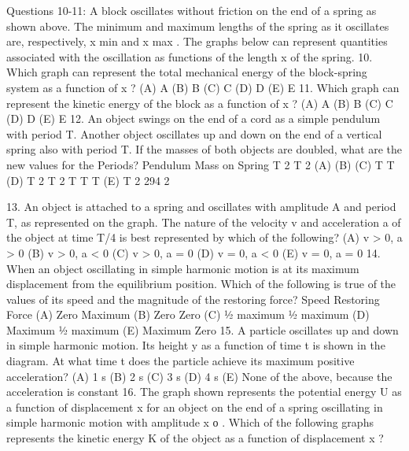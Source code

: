 Questions 10-11: A block oscillates without friction on the end of a spring as shown above. The minimum and
maximum lengths of the spring as it oscillates are, respectively, x min and x max . The graphs below can represent
quantities associated with the oscillation as functions of the length x of the spring.
10. Which graph can represent the total mechanical energy of the block-spring system as a function of x ?
(A) A
(B) B
(C) C
(D) D
(E) E
11. Which graph can represent the kinetic energy of the block as a function of x ?
(A) A
(B) B
(C) C
(D) D
(E) E
12. An object swings on the end of a cord as a simple pendulum with period T. Another object oscillates up and
down on the end of a vertical spring also with period T. If the masses of both objects are doubled, what are the
new values for the Periods?
Pendulum
Mass on Spring
T
2
T 2
(A)
(B)
(C) T
T
(D) T 2
T 2
T
T
T
(E) T 2
294
2



13. An object is attached to a spring and oscillates with amplitude A
and period T, as represented on the graph. The nature of the
velocity v and acceleration a of the object at time T/4 is best
represented by which of the following?
(A) v > 0, a > 0
(B) v > 0, a < 0
(C) v > 0, a = 0
(D) v = 0, a < 0
(E) v = 0, a = 0
14. When an object oscillating in simple harmonic motion is at its maximum displacement from the equilibrium
position. Which of the following is true of the values of its speed and the magnitude of the restoring force?
Speed
Restoring Force
(A) Zero
Maximum
(B) Zero
Zero
(C) 1⁄2 maximum
1⁄2 maximum
(D) Maximum
1⁄2 maximum
(E) Maximum
Zero
15. A particle oscillates up and down in simple harmonic
motion. Its height y as a function of time t is shown in the
diagram. At what time t does the particle achieve its
maximum positive acceleration?
(A) 1 s
(B) 2 s
(C) 3 s
(D) 4 s
(E) None of the above, because the acceleration is
constant
16. The graph shown represents the potential energy U as a function of
displacement x for an object on the end of a spring oscillating in
simple harmonic motion with amplitude x ο . Which of the
following graphs represents the kinetic energy K of the object as a
function of displacement x ?



